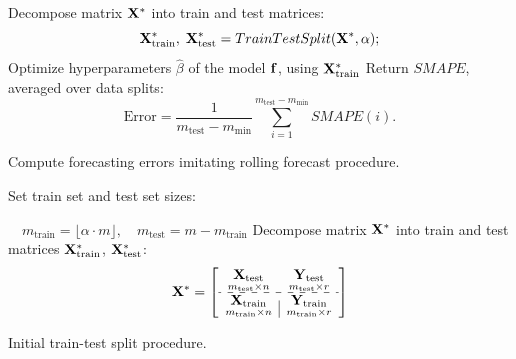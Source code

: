 \documentclass[conference]{IEEEtran}
\begin{document}
\begin{algorithm}[!h]
 Decompose matrix ${\mathbf{X}}^{*}$ into train and test matrices:
 \[{\mathbf{X}}^{*}_{\text{train}}, \; {\mathbf{X}}^{*}_{\text{test}} = TrainTestSplit({\mathbf{X}}^{*}, \alpha);\]
 Optimize hyperparameters $\hat{\beta}$ of the model ${\mathbf{f}}$, using ${\mathbf{X}}^{*}_{\text{train}}$ \;
  Return $SMAPE$, averaged over data splits:
  \[ \text{Error}  = \frac{1}{m_{\text{test}} - m_{\min}} \sum_{i=1}^{m_{\text{test}} - m_{\min}} {SMAPE}(i).\]
  \bigskip
 \caption{Compute forecasting errors imitating rolling forecast procedure.}\label{alg:train_test_rmse}
\end{algorithm}

\begin{algorithm}[!h]
\DontPrintSemicolon
 Set train set and test set sizes:

 $ \quad m_{\text{train}} = \lfloor\alpha\cdot m\rfloor, \quad m_{\text{test}} = m - m_{\text{train}} $ \; %
 Decompose matrix ${\mathbf{X}}^{*}$ into train and test matrices ${\mathbf{X}}^{*}_{\text{train}}$, ${\mathbf{X}}^{*}_{\text{test}}$:
 \[\bX^{*} = \left[\begin{array}{c|c}
 \underset{m_{\text{test}}{\times}n}{\bX_{\text{test}}} & \underset{m_{\text{test}}{\times}r}{\bY_{\text{test}}}  \\
 \hdashline
 \underset{m_{\text{train}}{\times}n}{\bX_{\text{train}}}  & \underset{m_{\text{train}}{\times}r}{\bY_{\text{train}}}
 \end{array}\right]
 \]
  \caption{Initial train-test split procedure.}\label{alg:train_test_rmse}
\end{algorithm}
\end{document}
